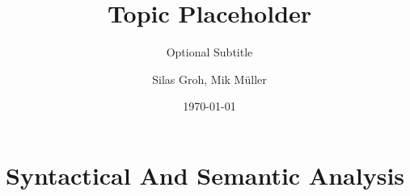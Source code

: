 



% 
% 

\titlehead{\centering\texttt{[image: pictures/title.png]}}
\title{Topic Placeholder}
\subtitle{Optional Subtitle}
\author{Silas Groh, Mik Müller}
\publishers{Carl Fuhlrott Gymnasium}
\date{\today}


\maketitle

\tableofcontents

\chapter{Syntactical And Semantic Analysis}





%

\listoffigures
\listoftables
{}
\nocite{*}
\printbibliography[heading=bibintoc]

